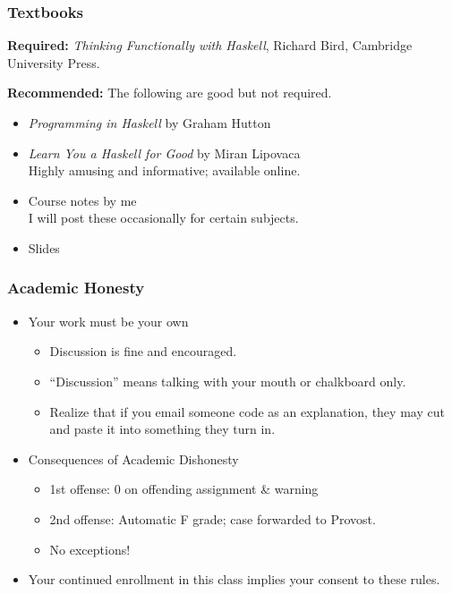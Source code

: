 \documentclass{beamer}
\begin{document}
\begin{frame}%
    \frametitle{Textbooks}

{\bf Required:} \emph{Thinking Functionally with Haskell}, Richard Bird, Cambridge University Press.

{\bf Recommended:} The following are good but not required.    
\begin{itemize}
\item  \emph{Programming in Haskell} by Graham Hutton\\

\item \emph{Learn You a Haskell for Good} by Miran Lipovaca\\
Highly amusing and informative; available online.

\item Course notes by me \\
I will post these occasionally for certain subjects.

\item Slides

\end{itemize}

\end{frame}

\begin{frame}%
    \frametitle{Academic Honesty}
    
\begin{itemize}
\item Your work must be your own
\begin{itemize}
\item Discussion is fine and encouraged.
\pause
\item ``Discussion'' means talking with your mouth or chalkboard only.
\item Realize that if you email someone code as an explanation, they may cut and paste it into something they turn in.
\end{itemize}

\pause

\item Consequences of Academic Dishonesty
\begin{itemize}
\item 1st offense: 0 on offending assignment \& warning
\item 2nd offense: Automatic F grade; case forwarded to Provost.
\pause
\item No exceptions!
\end{itemize}

\pause

\item Your continued enrollment in this class implies your consent to these rules.
\end{itemize}

\end{frame}
\end{document}
